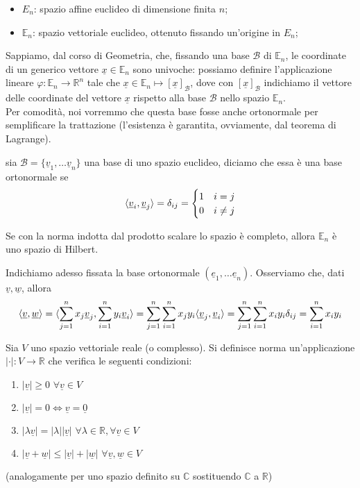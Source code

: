 	\begin{itemize}
		\item $E_n$: spazio affine euclideo di dimensione finita $n$;
		\item $\mathbb{E}_n$: spazio vettoriale euclideo, ottenuto fissando un'origine in $E_n$;
	\end{itemize}
	Sappiamo, dal corso di Geometria, che, fissando una base $\mathcal{B}$ di $\mathbb{E}_n$, le coordinate di un generico vettore $\underline{x} \in \mathbb{E}_n$ sono univoche: possiamo definire l'applicazione lineare $\varphi: \mathbb{E}_n \to \mathbb{R}^n$ tale che $\underline{x} \in \mathbb{E}_n \mapsto [\underline{x}]_{\mathcal{B}}$, dove con $[\underline{x}]_{\mathcal{B}}$ indichiamo il vettore delle coordinate del vettore $\underline{x}$ rispetto alla base $\mathcal{B}$ nello spazio $\mathbb{E}_n$. \\
Per comodità, noi vorremmo che questa base fosse anche ortonormale per semplificare la trattazione (l'esistenza è garantita, ovviamente, dal teorema di Lagrange). 
\begin{definition}
	sia $\mathcal{B} = \{ \underline{v}_1, \ldots \underline{v}_n \}$ una base di uno spazio euclideo, diciamo che essa è una base ortonormale se
	$$
	\langle \underline{v}_i, \underline{v}_j \rangle = \delta_{ij} = \begin{cases} 1 & i = j \\ 0 & i \neq j \end{cases}	
	$$
\end{definition}
\begin{remark}
	Se con la norma indotta dal prodotto scalare lo spazio è completo, allora $\mathbb{E}_n$ è uno spazio di Hilbert.
\end{remark}
\noindent Indichiamo adesso fissata la base ortonormale $(\underline{e}_1, \ldots \underline{e}_n)$. Osserviamo che, dati $\underline{v}, \underline{w}$, allora
$$
\langle \underline{v}, \underline{w} \rangle = \langle \sum_{j=1}^n x_j \underline{v}_j, \sum_{i=1}^n y_i \underline{v}_i \rangle = \sum_{j=1}^n \sum_{i=1}^n x_j y_i \langle \underline{v}_j, \underline{v}_i \rangle = \sum_{j=1}^n \sum_{i=1}^n x_i y_i \delta_{ij} = \sum_{i=1}^n x_i y_i
$$
\begin{definition}[norma]
	Sia $V$ uno spazio vettoriale reale (o complesso). Si definisce norma un'applicazione $| \cdot |: V \to \mathbb{R}$ che verifica le seguenti condizioni:
	\begin{enumerate}[label=\protect\circled{\arabic*}]
		\item $|\underline{v}| \geq 0 \, \, \forall \underline{v} \in V$
		\item $| \underline{v} | = 0 \iff \underline{v} = \underline{0}$
		\item $| \lambda \underline{v} | = | \lambda | | \underline{v} | \, \, \forall \lambda \in \mathbb{R}, \forall \underline{v} \in V$
		\item $| \underline{v} + \underline{w} | \leq | \underline{v} | + | \underline{w} | \, \, \forall \underline{v}, \underline{w} \in V$
	\end{enumerate}
	(analogamente per uno spazio definito su $\mathbb{C}$ sostituendo $\mathbb{C}$ a $\mathbb{R}$)
\end{definition}
